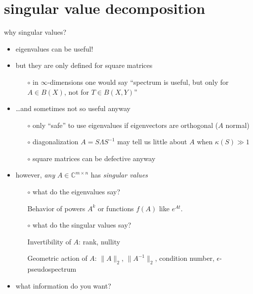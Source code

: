 \documentclass[10pt,hyperref]{beamer}
\newcommand{\CC}{\mathbb{C}}
\newcommand{\eps}{\epsilon}
\begin{document}
\section{singular value decomposition}

\begin{frame}{why singular values?}

\begin{itemize}
\item eigenvalues can be useful!
\item but they are only defined for square matrices
    \begin{itemize}
    \item[$\circ$] in $\infty$-dimensions one would say ``spectrum is useful, but only for $A\in B(X)$, not for $T \in B(X,Y)$''
    \end{itemize}
\item \dots and sometimes not so useful anyway
    \begin{itemize}
    \item[$\circ$] only ``safe'' to use eigenvalues if eigenvectors are orthogonal ($A$ normal)
    \item[$\circ$] diagonalization $A=S\Lambda S^{-1}$ may tell us little about $A$ when $\kappa(S)\gg 1$
    \item[$\circ$] square matrices can be defective anyway
    \end{itemize}
\item however, \emph{any} $A \in \CC^{m\times n}$ has \emph{singular values}
    \begin{itemize}

\medskip
    \item[$\circ$] what do the \alert{eigenvalues} say?

\medskip
    Behavior of powers $A^k$ or functions $f(A)$ like $e^{At}$.

\medskip
    \item[$\circ$] what do the \alert{singular values} say?

\medskip
Invertibility of $A$: rank, nullity

\medskip
Geometric action of $A$: $\|A\|_2$, $\|A^{-1}\|_2$, condition number, $\eps$-pseudospectrum
    \end{itemize}
\item what information do you want?
\end{itemize}
\end{frame}
\end{document}
